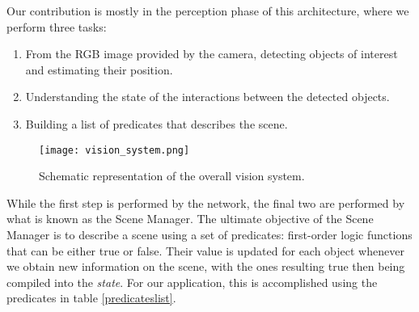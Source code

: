 Our contribution is mostly in the perception phase of this architecture, where we perform three tasks:

\begin{enumerate}
    \item From the RGB image provided by the camera, detecting objects of interest and estimating their position.
    \item Understanding the state of the interactions between the detected objects.
    \item Building a list of predicates that describes the scene.
\end{enumerate}

\begin{figure}[ht]
    \texttt{[image: vision\_system.png]}
    \caption{Schematic representation of the overall vision system.}
\end{figure}

While the first step is performed by the network, the final two are performed by what is known as the Scene Manager. The ultimate objective of the Scene Manager is to describe a scene using a set of predicates: first-order logic functions that can be either true or false. Their value is updated for each object whenever we obtain new information on the scene, with the ones resulting true then being compiled into the \emph{state}. For our application, this is accomplished using the predicates in table \ref{predicateslist}.

\begin{table}[ht]
    \begin{center}
        \caption{List of predicates used to describe the state in our application.}
        \label{predicateslist}
    \end{center}
\end{table}

